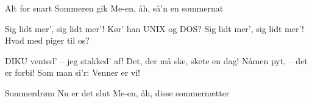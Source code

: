 \documentclass[10pt]{article}
\begin{document}
\begin{song}
   Alt for snart
                Sommeren gik
                Me-en, åh, så'n en sommernat


     Sig lidt mer', sig lidt mer'!
      Kør' han UNIX og DOS?
     Sig lidt mer', sig lidt mer'!
      Hvad med piger til os?

       DIKU vented' -- jeg stakked' af!
       Det, der må ske, skete en dag!
       Nåmen pyt, -- det er forbi!
       Som man si'r: Venner er vi!

   Sommerdrøm
                Nu er det slut
                Me-en, åh, disse sommernætter

\end{song}
\end{document}
